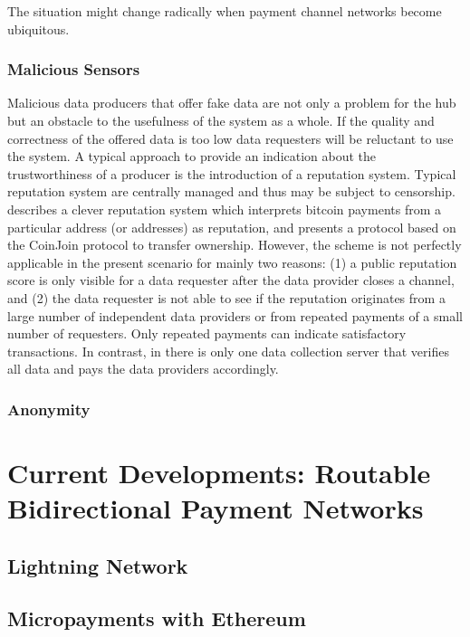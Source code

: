 The situation might change radically when payment channel networks become ubiquitous.  

\subsubsection{Malicious Sensors}

Malicious data producers that offer fake data are not only a problem for the hub but an obstacle to the usefulness of the system as a whole. If the quality and correctness of the offered data is too low data requesters will be reluctant to use the system.
A typical approach to provide an indication about the trustworthiness of a producer is the introduction of a reputation system. Typical reputation system are centrally managed and thus may be subject to censorship. \cite{s16060776} describes a clever reputation system which interprets bitcoin payments from a particular address (or addresses) as reputation, and presents a protocol based on the CoinJoin protocol to transfer ownership. However, the scheme is not perfectly applicable in the present scenario for mainly two reasons: (1) a public reputation score is only visible for a data requester after the data provider closes a channel, and (2) the data requester is not able to see if the reputation originates from a large number of independent data providers or from repeated payments of a small number of requesters. Only repeated payments can indicate satisfactory transactions. In contrast, in \cite{s16060776} there is only one data collection server that verifies all data and pays the data providers accordingly.

\subsubsection{Anonymity}




\section{Current Developments: Routable Bidirectional Payment Networks}

\subsection{Lightning Network}

\subsection{Micropayments with Ethereum}



